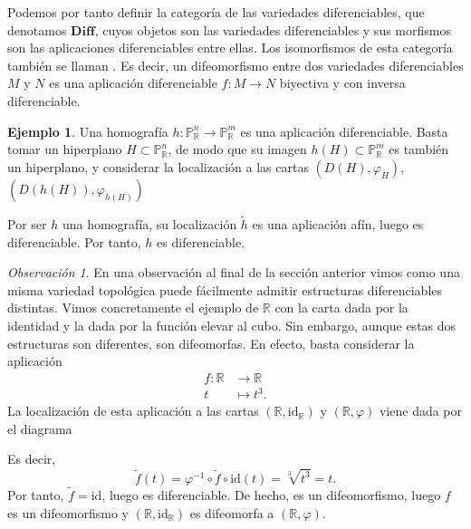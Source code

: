 \documentclass[12pt,a4paper]{book}
\theoremstyle{definition} \newtheorem{defn}[thm]{Definición}
\theoremstyle{definition} \newtheorem{ejemplo}[thm]{Ejemplo}
\theoremstyle{definition} \newtheorem{ejercicio}[thm]{Ejercicio}
\theoremstyle{remark} \newtheorem*{obs}{Observación}
\def\RR{\mathbb{R}}
\def\PP{\mathbb{P}}
\def\id{\mathrm{id}}
\let\emph\relax
\begin{document}
       Podemos por tanto definir la categoría de las variedades diferenciables, que denotamos $\mathbf{Diff}$, cuyos objetos son las variedades diferenciables y sus morfismos son las aplicaciones diferenciables entre ellas. Los isomorfismos de esta categoría también se llaman \emph{difeomorfismo}. Es decir, un difeomorfismo entre dos variedades diferenciables $M$ y $N$ es una aplicación diferenciable $f:M\rightarrow N$ biyectiva y con inversa diferenciable.

       \begin{ejemplo}
	 Una homografía $h:\PP^n_\RR \rightarrow \PP^m_\RR$ es una aplicación diferenciable. Basta tomar un hiperplano $H \subset \PP^n_\RR$, de modo que su imagen $h(H)\subset \PP^m_\RR$ es también un hiperplano, y considerar la localización a las cartas $(D(H),\varphi_H)$, $(D(h(H)),\varphi_{h(H)})$
      \begin{center}
       \end{center}
       Por ser $h$ una homografía, su localización $\tilde{h}$ es una aplicación afín, luego es diferenciable. Por tanto, $h$ es diferenciable.
       \end{ejemplo}

       \begin{obs}
	 En una observación al final de la sección anterior vimos como una misma variedad topológica puede fácilmente admitir estructuras diferenciables distintas. Vimos concretamente el ejemplo de $\RR$ con la carta dada por la identidad y la dada por la función elevar al cubo. Sin embargo, aunque estas dos estructuras son diferentes, son difeomorfas. En efecto, basta considerar la aplicación
	 \begin{align*}
	   f :\RR&\longrightarrow \RR\\ 
	   t &\longmapsto t^3. 
	   \end{align*}
	   La localización de esta aplicación a las cartas $(\RR,\id_\RR)$ y $(\RR,\varphi)$ viene dada por el diagrama
      \begin{center}
       \end{center}
       Es decir, 
       \begin{equation*}
	 \tilde{f}(t)=\varphi^{-1}\circ \tilde{f} \circ \id (t)= \sqrt[3]{t^3}=t.
       \end{equation*}
       Por tanto, $\tilde{f}=\id$, luego es diferenciable. De hecho, es un difeomorfismo, luego $f$ es un difeomorfismo y $(\RR,\id_\RR)$ es difeomorfa a $(\RR,\varphi)$.
       \end{obs}
\end{document}
